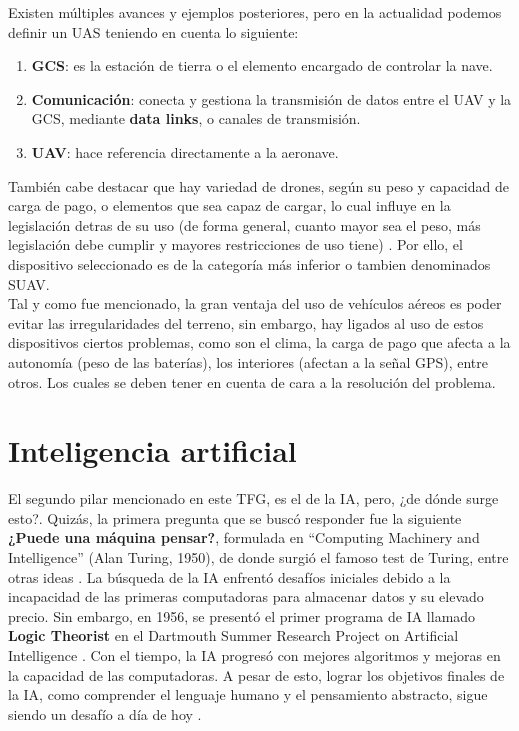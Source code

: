 Existen múltiples avances y ejemplos posteriores, pero en la actualidad podemos definir un \ac{UAS} teniendo en cuenta lo siguiente:

\begin{enumerate}
	\item \textbf{\ac{GCS}}: es la estación de tierra o el elemento encargado de controlar la nave.

	\item \textbf{Comunicación}: conecta y gestiona la transmisión de datos entre el \ac{UAV} y la \ac{GCS}, mediante \textbf{data links}, o canales de transmisión.
	
    \item \textbf{\ac{UAV}}: hace referencia directamente a la aeronave.
\end{enumerate} \cite{uas-definicion} \cite{gcs-definicion} \cite{data-link-definicion}

También cabe destacar que hay variedad de drones, según su peso y capacidad de carga de pago, o elementos que sea capaz de cargar, lo cual influye en la legislación detras de su uso (de forma general, cuanto mayor sea el peso, más legislación debe cumplir y mayores restricciones de uso tiene) \cite{drone-regulation}. Por ello, el dispositivo seleccionado es de la categoría más inferior o tambien denominados \ac{SUAV}.\\

Tal y como fue mencionado, la gran ventaja del uso de vehículos aéreos es poder evitar las irregularidades del terreno, sin embargo, hay ligados al uso de estos dispositivos ciertos problemas, como son el clima, la carga de pago que afecta a la autonomía (peso de las baterías), los interiores (afectan a la señal GPS), entre otros. Los cuales se deben tener en cuenta de cara a la resolución del problema.\\

\section{Inteligencia artificial}
\label{subsec:inteligencia_artificial}

El segundo pilar mencionado en este \ac{TFG}, es el de la \ac{IA}, pero, ¿de dónde surge esto?. Quizás, la primera pregunta que se buscó responder fue la siguiente \textbf{¿Puede una máquina pensar?}, formulada en ``Computing Machinery and Intelligence'' (Alan Turing, 1950), de donde surgió el famoso test de Turing, entre otras ideas \cite{turing-paper}. La búsqueda de la \ac{IA} enfrentó desafíos iniciales debido a la incapacidad de las primeras computadoras para almacenar datos y su elevado precio. Sin embargo, en 1956, se presentó el primer programa de \ac{IA} llamado \textbf{Logic Theorist} en el Dartmouth Summer Research Project on Artificial Intelligence \cite{logic-theorist}. Con el tiempo, la IA progresó con mejores algoritmos y mejoras en la capacidad de las computadoras. A pesar de esto, lograr los objetivos finales de la IA, como comprender el lenguaje humano y el pensamiento abstracto, sigue siendo un desafío a día de hoy \cite{history-ai}.\\

